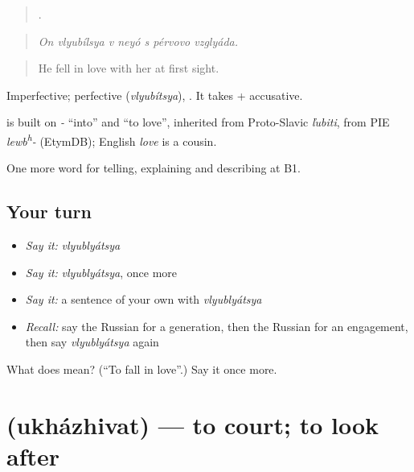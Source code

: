 \begin{quote}
      .
\end{quote}

\begin{quote}
\emph{On vlyubílsya v neyó s pérvovo vzglyáda.}
\end{quote}

\begin{quote}
He fell in love with her at first sight.
\end{quote}

Imperfective; perfective \emph{} (\emph{vlyubítsya}), \emph{}. It takes \emph{} + accusative.

\begin{cousinweb}
\emph{} is built on \emph{-} \textquotedblleft{}into\textquotedblright{} and \emph{} \textquotedblleft{}to love\textquotedblright{}, inherited from Proto-Slavic \emph{ľubiti}, from PIE \emph{lewb\textsuperscript{h}-} (EtymDB); English \emph{love} is a cousin.
\end{cousinweb}

\begin{grammarlens}[title={What you've built}]
One more word for telling, explaining and describing at B1.
\end{grammarlens}

\subsection*{Your turn}
\begin{itemize}
\raggedright
  \item \emph{Say it:} \emph{vlyublyátsya}
  \item \emph{Say it:} \emph{vlyublyátsya}, once more
  \item \emph{Say it:} a sentence of your own with \emph{vlyublyátsya}
  \item \emph{Recall:} say the Russian for a generation, then the Russian for an engagement, then say \emph{vlyublyátsya} again
\end{itemize}

\begin{tcolorbox}[breakable,colback=teal!4,colframe=teal!35!black,title={Before you move on}]
What does  mean? (\textquotedblleft{}To fall in love\textquotedblright{}.) Say it once more.
\end{tcolorbox}
\section[\texorpdfstring{\ru{ухаживать} (ukházhivat)}{ухаживать (ukházhivat)}]{ (ukházhivat) — to court; to look after}

